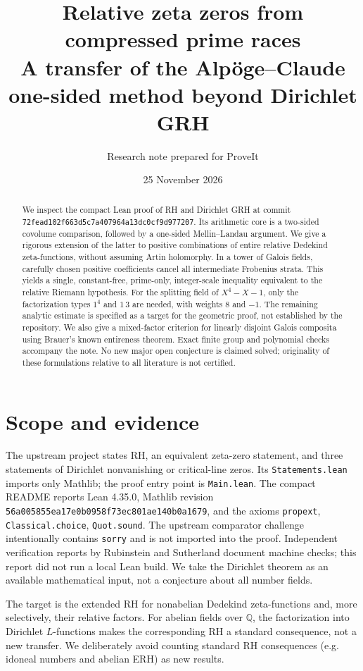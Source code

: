 \documentclass[11pt]{article}
\title{\color{ink}\bfseries Relative zeta zeros from compressed prime races\\[5pt]\large A transfer of the Alp\"oge--Claude one-sided method beyond Dirichlet GRH}
\author{Research note prepared for ProveIt}
\date{25 November 2026}
\theoremstyle{remark}\newtheorem{remark}[theorem]{Remark}
\newcommand{\Q}{\mathbb Q}\newcommand{\C}{\mathbb C}\newcommand{\R}{\mathbb R}\newcommand{\ind}{\mathbf 1}\newcommand{\ord}{\operatorname{ord}}\newcommand{\Rea}{\operatorname{Re}}
\begin{document}
\maketitle
\begin{abstract}
We inspect the compact Lean proof of RH and Dirichlet GRH at commit
\nolinkurl{72fead102f663d5c7a407964a13dc0cf9d977207}. Its arithmetic core is a two-sided covolume comparison, followed by a one-sided Mellin--Landau argument. We give a rigorous extension of the latter to positive combinations of entire relative Dedekind zeta-functions, without assuming Artin holomorphy. In a tower of Galois fields, carefully chosen positive coefficients cancel all intermediate Frobenius strata. This yields a single, constant-free, prime-only, integer-scale inequality equivalent to the relative Riemann hypothesis. For the splitting field of $X^4-X-1$, only the factorization types $1^4$ and $1\,3$ are needed, with weights $8$ and $-1$. The remaining analytic estimate is specified as a target for the geometric proof, not established by the repository. We also give a mixed-factor criterion for linearly disjoint Galois composita using Brauer's known entireness theorem. Exact finite group and polynomial checks accompany the note. No new major open conjecture is claimed solved; originality of these formulations relative to all literature is not certified.
\end{abstract}
\tableofcontents
\section{Scope and evidence}
The upstream project \cite{upstream} states RH, an equivalent zeta-zero statement, and three statements of Dirichlet nonvanishing or critical-line zeros. Its \texttt{Statements.lean} imports only Mathlib; the proof entry point is \texttt{Main.lean}. The compact README reports Lean 4.35.0, Mathlib revision \nolinkurl{56a005855ea17e0b0958f73ec801ae140b0a1679}, and the axioms \texttt{propext}, \texttt{Classical.choice}, \texttt{Quot.sound}. The upstream comparator challenge intentionally contains \texttt{sorry} and is not imported into the proof. Independent verification reports by Rubinstein and Sutherland \cite{rubinstein,sutherland} document machine checks; this report did not run a local Lean build. We take the Dirichlet theorem as an available mathematical input, not a conjecture about all number fields.

The target is the extended RH for nonabelian Dedekind zeta-functions and, more selectively, their relative factors. For abelian fields over $\Q$, the factorization into Dirichlet $L$-functions makes the corresponding RH a standard consequence, not a new transfer. We deliberately avoid counting standard RH consequences (e.g. idoneal numbers and abelian ERH) as new results.
\end{document}
